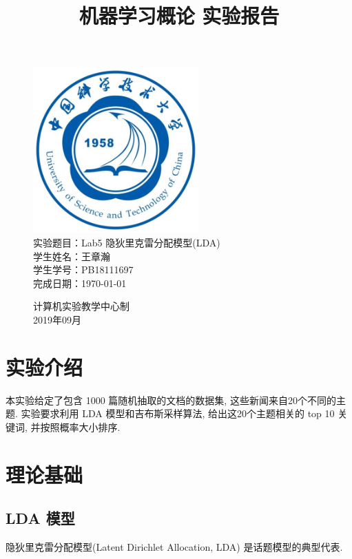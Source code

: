 \documentclass[UTF8]{article}
\title{机器学习概论 实验报告}
\date{}
\begin{document}
\maketitle
\begin{figure}[H]
	\centering
	\includegraphics[width=2.5in]{xiaohui.png}\vspace{0.5cm}\\
	\large{
		实验题目：Lab5 隐狄里克雷分配模型(LDA)\\
		学生姓名：王章瀚\\
		学生学号：PB18111697\\
		完成日期：\today\\
	}\vspace{2cm}
	
	\large{计算机实验教学中心制\\2019年09月\\}
	\thispagestyle{empty}
	\clearpage  %
\end{figure}
\newpage
\tableofcontents
\newpage
\section{实验介绍}
本实验给定了包含 1000 篇随机抽取的文档的数据集, 这些新闻来自20个不同的主题. 实验要求利用 LDA 模型和吉布斯采样算法, 给出这20个主题相关的 top 10 关键词, 并按照概率大小排序.

\section{理论基础}
\subsection{LDA 模型}
隐狄里克雷分配模型(Latent Dirichlet Allocation, LDA) 是话题模型的典型代表.
\end{document}
